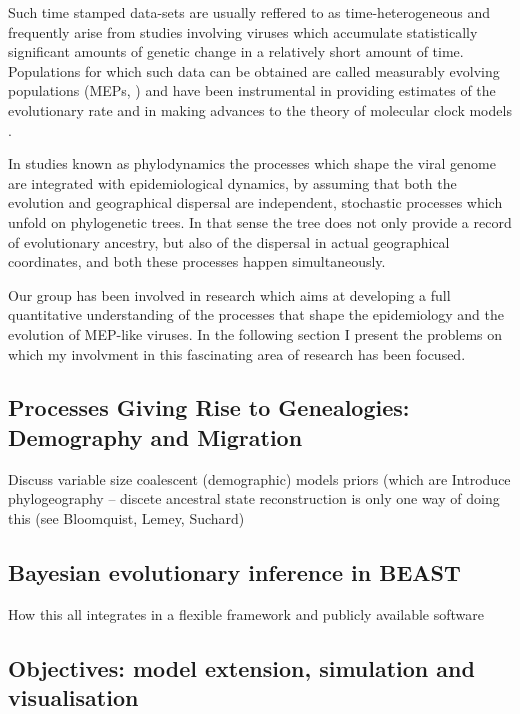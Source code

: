 Such time stamped data-sets are usually reffered to as time-heterogeneous and frequently arise from studies involving viruses which accumulate statistically significant amounts of genetic change in a relatively short amount of time.
Populations for which such data can be obtained are called measurably evolving populations (MEPs, \cite{Drummond2003}) and have been instrumental in providing estimates of the evolutionary rate and in making advances to the theory of molecular clock models \citep{Drummond2006}.

In studies known as phylodynamics the processes which shape the viral genome are integrated with epidemiological dynamics, by assuming that both the evolution and 
geographical dispersal are independent, stochastic processes which unfold on phylogenetic trees.
In that sense the tree does not only provide a record of evolutionary ancestry, but also of the dispersal in actual geographical coordinates, and both these processes happen simultaneously.

Our group has been involved in research which aims at developing a full quantitative understanding of the processes that shape the epidemiology and the evolution of MEP-like viruses.
In the following section I present the problems on which my involvment in this fascinating area of research has been focused.


\subsection{Processes Giving Rise to Genealogies: Demography and Migration}


Discuss variable size coalescent (demographic) models priors (which are
Introduce phylogeography -- discete ancestral state reconstruction is only one way of doing this (see Bloomquist, Lemey, Suchard)


\subsection{Bayesian evolutionary inference in BEAST}


How this all integrates in a flexible framework and publicly available software



\subsection{Objectives: model extension, simulation and visualisation}

